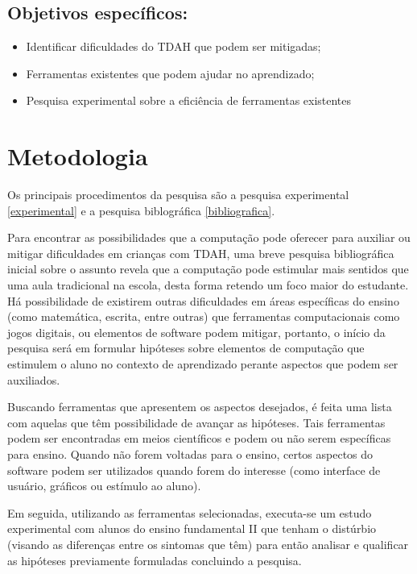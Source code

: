\subsection{Objetivos específicos:}

\begin{itemize}
    \item Identificar dificuldades do TDAH que podem ser mitigadas;
    \item Ferramentas existentes que podem ajudar no aprendizado;
    \item Pesquisa experimental sobre a eficiência de ferramentas existentes
\end{itemize}


\section{Metodologia}

Os principais procedimentos da pesquisa são a pesquisa experimental \ref{experimental} e a pesquisa biblográfica \ref{bibliografica}.

Para encontrar as possibilidades que a computação pode oferecer para auxiliar ou mitigar dificuldades em crianças com TDAH, uma breve pesquisa bibliográfica inicial sobre o assunto revela que a computação pode estimular mais sentidos que uma aula tradicional na escola, desta forma retendo um foco maior do estudante. Há possibilidade de existirem outras dificuldades em áreas específicas do ensino (como matemática, escrita, entre outras) que ferramentas computacionais como jogos digitais, ou elementos de software podem mitigar, portanto, o início da pesquisa será em formular hipóteses sobre elementos de computação que estimulem o aluno no contexto de aprendizado perante aspectos que podem ser auxiliados.

Buscando ferramentas que apresentem os aspectos desejados, é feita uma lista com aquelas que têm possibilidade de avançar as hipóteses. Tais ferramentas podem ser encontradas em meios científicos e podem ou não serem específicas para ensino. Quando não forem voltadas para o ensino, certos aspectos do software podem ser utilizados quando forem do interesse (como interface de usuário, gráficos ou estímulo ao aluno).

Em seguida, utilizando as ferramentas selecionadas, executa-se um estudo experimental com alunos do ensino fundamental II que tenham o distúrbio (visando as diferenças entre os sintomas que têm) para então analisar e qualificar as hipóteses previamente formuladas concluindo a pesquisa.
